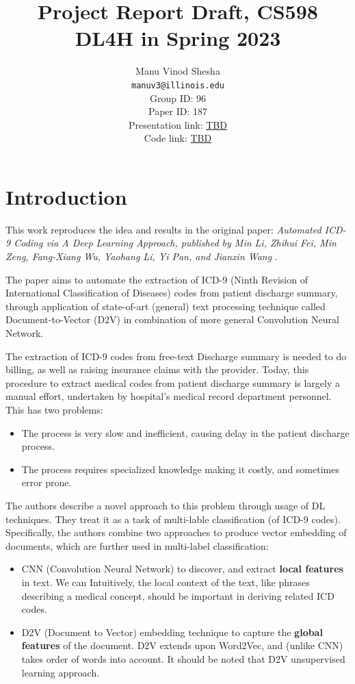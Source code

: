 \documentclass[11pt,a4paper]{article}
\title{Project Report Draft, CS598 DL4H in Spring 2023}
\author{Manu Vinod Shesha \\
  \texttt{manuv3@illinois.edu}
  \\[2em]
  Group ID: 96\\
  Paper ID: 187\\
  Presentation link: \url{TBD} \\
  Code link: \url{TBD}}
\begin{document}
\maketitle


\section{Introduction}

This work reproduces the idea and results in the original paper: \textit{Automated ICD-9 Coding via A Deep Learning Approach, published by Min Li, Zhihui Fei, Min Zeng, Fang-Xiang Wu, Yaohang Li, Yi Pan, and Jianxin Wang} \cite{8320340}.

The paper aims to automate the extraction of ICD-9 (Ninth Revision of International Classification of Diseases) codes from patient discharge summary, through application of state-of-art (general) text processing technique called Document-to-Vector (D2V) in combination of more general Convolution Neural Network.

The extraction of ICD-9 codes from free-text Discharge summary is needed to do billing, as well as raising insurance claims with the provider. Today, this procedure to extract medical codes from patient discharge summary is largely a manual effort, undertaken by hospital’s medical record department personnel. This has two problems:
\begin{itemize}
    \item The process is very slow and inefficient, causing delay in the patient discharge process.
    \item The process requires specialized knowledge making it costly, and sometimes error prone.
\end{itemize}

The authors describe a novel approach to this problem through usage of DL techniques. They treat it as a task of multi-lable classification (of ICD-9 codes). Specifically, the authors combine two approaches to produce vector embedding of documents, which are further used in multi-label classification:
\begin{itemize}
    \item CNN (Convolution Neural Network) to discover, and extract \textbf{local features} in text. We can Intuitively, the local context of the text, like phrases describing a medical concept, should be important in deriving related ICD codes.
    \item D2V (Document to Vector) \cite{le2014distributed} embedding technique to capture the \textbf{global features} of the document. D2V extends upon Word2Vec, and (unlike CNN) takes order of words into account. It should be noted that D2V unsupervised learning approach.
\end{itemize}
\end{document}

